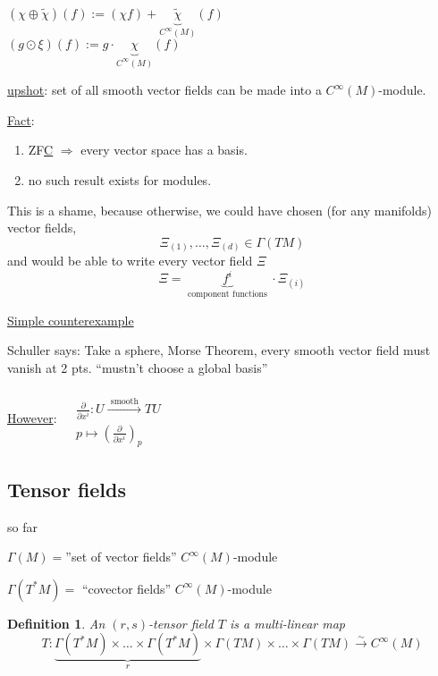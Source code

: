 \documentclass[10pt, twoside]{amsart}
\newtheorem{definition}{Definition}
\begin{document}
\begin{multicols*}{2}
$(\chi \oplus \widetilde{\chi})(f) := (\chi f) + \underbrace{\widetilde{\chi}}_{C^{\infty}(M)}(f)$ \\

$(g\odot \xi)(f) := g \cdot \underbrace{ \chi }_{C^{\infty}(M)}(f)$


\underline{upshot}: set of all smooth vector fields can be made into a $C^{\infty}(M)$-module.  

\underline{Fact}: \begin{enumerate}
\item[(1)] ZF\underline{C} $\Longrightarrow $ every vector space has a basis. 
\item[(2)] no such result exists for modules.  
\end{enumerate}

This is a shame, because otherwise, we could have chosen (for any manifolds) vector fields, 
\[
\Xi_{(1)}, \dots , \Xi_{(d)} \in \Gamma(TM)
\]
and would be able to write every vector field $\Xi$
\[
\Xi = \underbrace{ f^i }_{\text{ component functions } } \cdot \Xi_{(i)}
\]

\underline{Simple counterexample}

Schuller says: Take a sphere, Morse Theorem, every smooth vector field must vanish at 2 pts. ``mustn't choose a global basis''


\underline{However}: $\begin{aligned} & \quad \\
  & \frac{ \partial }{ \partial x^i} : U \xrightarrow{ \text{ smooth }} TU \\
  & p \mapsto \left( \frac{ \partial }{ \partial x^i } \right)_p
\end{aligned}$

\subsection{Tensor fields}

so far

$\Gamma(M) = $''set of vector fields''  $C^{\infty}(M)$-module

 $\Gamma(T^*M) = $ ``covector fields'' $C^{\infty}(M)$-module

\begin{definition}
An $(r,s)$-tensor field $T$ is a multi-linear map
\[
T:\underbrace{ \Gamma(T^*M) \times \dots \times \Gamma(T^*M) }_{r} \times \Gamma(TM) \times \dots \times \Gamma(TM) \xrightarrow{ \sim } C^{\infty}(M)
\]
\end{definition}


\end{multicols*}
\end{document}
